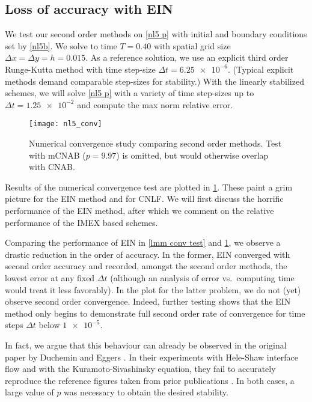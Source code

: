 \subsection{Loss of accuracy with EIN}
We test our second order methods on \cref{nl5 p} with initial and boundary conditions set by \cref{nl5b}. We solve to time $T=0.40$ with spatial grid size $\Delta x = \Delta y = h =0.015$. As a reference solution, we use an explicit third order Runge-Kutta method with time step-size $\Delta t=\num{6.25e-6}$. (Typical explicit methods demand comparable step-sizes for stability.) With the linearly stabilized schemes, we will solve \cref{nl5 p} with a variety of time step-sizes up to $\Delta t = \num{1.25e-2}$ and compute the max norm relative error.

\begin{figure}[htb!]
        \centering
\texttt{[image: nl5\_conv]}
\caption[Numerical convergence study comparing second order methods.]{Numerical convergence study comparing second order methods. Test with mCNAB ($p=9.97$) is omitted, but would otherwise overlap with CNAB.}
\label{fig:nl5 conv}
\end{figure}

Results of the numerical convergence test are plotted in \cref{fig:nl5 conv}. These paint a grim picture for the EIN method and for CNLF. We will first discuss the horrific performance of the EIN method, after which we comment on the relative performance of the IMEX based schemes. 

Comparing the performance of EIN in \cref{lmm conv test} and \cref{fig:nl5 conv}, we observe a drastic reduction in the order of accuracy. In the former, EIN converged with second order accuracy and recorded, amongst the second order methods, the lowest error at any fixed $\Delta t$ (although an analysis of error vs.\ computing time would treat it less favorably). In the plot for the latter problem, we do not (yet) observe second order convergence. Indeed, further testing shows that the EIN method only begins to demonstrate full second order rate of convergence for time steps $\Delta t$ below $\num{1e-5}$.

In fact, we argue that this behaviour can already be observed in the original paper by Duchemin and Eggers \cite{duchemin2014explicit}. In their experiments with Hele-Shaw interface flow and with the Kuramoto-Sivashinsky equation, they fail to accurately reproduce the reference figures taken from prior publications \cite{hou1994removing,kassam2005fourth}. In both cases, a large value of $p$ was necessary to obtain the desired stability. 

